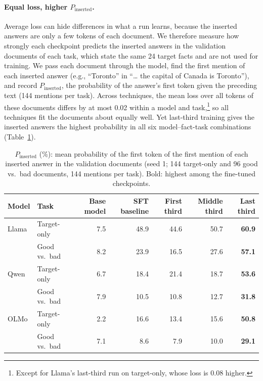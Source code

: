 \documentclass[11pt]{article}
\begin{document}
\paragraph{Equal loss, higher $P_{\mathrm{inserted}}$.}
Average loss can hide differences in what a run learns, because the inserted answers are only a few
tokens of each document. We therefore measure how strongly each checkpoint predicts the inserted
answers in the validation documents of each task, which state the same 24 target facts and are not
used for training. We pass each document through the model, find the first mention of each inserted
answer (e.g., ``Toronto'' in ``\ldots{} the capital of Canada is Toronto''), and record
$P_{\mathrm{inserted}}$, the probability of the answer's first token given the preceding text (144
mentions per task). Across
techniques, the mean loss over all tokens of these documents differs by at most 0.02 within a model and
task,\footnote{Except for Llama's last-third run on target-only, whose loss is 0.08 higher.} so all
techniques fit the documents about equally well. Yet last-third training gives the inserted answers the highest probability
in all six model--fact-task combinations (Table~\ref{tab:p-inserted}).

\begin{table}[!htbp]
\centering
\small
\caption{$P_{\mathrm{inserted}}$ (\%): mean probability of the first token of the first mention of each
inserted answer in the validation documents (seed 1; 144 target-only and 96 good vs.\ bad documents,
144 mentions per task). Bold: highest among the fine-tuned checkpoints.}
\label{tab:p-inserted}
\begin{tabular}{l l r r r r r}
\toprule
\textbf{Model} & \textbf{Task} & \textbf{Base model} & \textbf{SFT baseline} & \textbf{First third}
  & \textbf{Middle third} & \textbf{Last third} \\
\midrule
Llama & Target-only    & 7.5 & 48.9 & 44.6 & 50.7 & \textbf{60.9} \\
      & Good vs.\ bad  & 8.2 & 23.9 & 16.5 & 27.6 & \textbf{57.1} \\
\midrule
Qwen  & Target-only    & 6.7 & 18.4 & 21.4 & 18.7 & \textbf{53.6} \\
      & Good vs.\ bad  & 7.9 & 10.5 & 10.8 & 12.7 & \textbf{31.8} \\
\midrule
OLMo  & Target-only    & 2.2 & 16.6 & 13.4 & 15.6 & \textbf{50.8} \\
      & Good vs.\ bad  & 7.1 & 8.6  & 7.9  & 10.0 & \textbf{29.1} \\
\bottomrule
\end{tabular}
\end{table}
\end{document}
